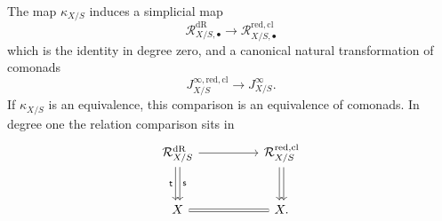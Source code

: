 \begin{theorem}
\label{thm:reduced-jet-comparison}
The map \(\kappa_{X/S}\) induces a simplicial map
\[
  \mathcal R^{\mathrm{dR}}_{X/S,\bullet}
  \longrightarrow
  \mathcal R^{\mathrm{red,cl}}_{X/S,\bullet}
\]
which is the identity in degree zero, and a canonical natural transformation
of comonads
\[
  J^{\infty,\mathrm{red,cl}}_{X/S}
  \longrightarrow
  J^\infty_{X/S}.
\]
If \(\kappa_{X/S}\) is an equivalence, this comparison is an equivalence of
comonads. In degree one the relation comparison sits in
\[
\begin{tikzcd}[column sep=huge,row sep=large]
\mathcal R^{\mathrm{dR}}_{X/S}
  \ar[r]
  \ar[d,shift left=.4ex,"\mathsf s"]
  \ar[d,shift right=.4ex,"\mathsf t"']
&
\mathcal R^{\mathrm{red,cl}}_{X/S}
  \ar[d,shift left=.4ex]
  \ar[d,shift right=.4ex]\\
X \ar[r,equal]
&
X .
\end{tikzcd}
\]
\end{theorem}

